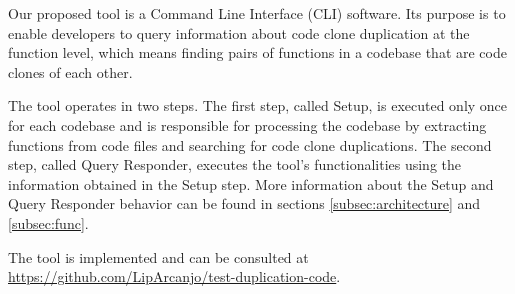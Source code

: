 \en

Our proposed tool is a Command Line Interface (CLI) software. Its purpose is to enable developers to query 
information about code clone duplication at the function level, which means finding pairs of functions in a codebase 
that are code clones of each other. 

The tool operates in two steps. The first step, called Setup, is executed only 
once for each codebase and is responsible for processing the codebase by extracting functions from code files and 
searching for code clone duplications. The second step, called Query Responder, executes the tool's functionalities 
using the information obtained in the Setup step. More information about the Setup and Query Responder behavior can 
be found in sections \ref{subsec:architecture}  and \ref{subsec:func}. 

The tool is implemented and can be consulted at \url{https://github.com/LipArcanjo/test-duplication-code}.
